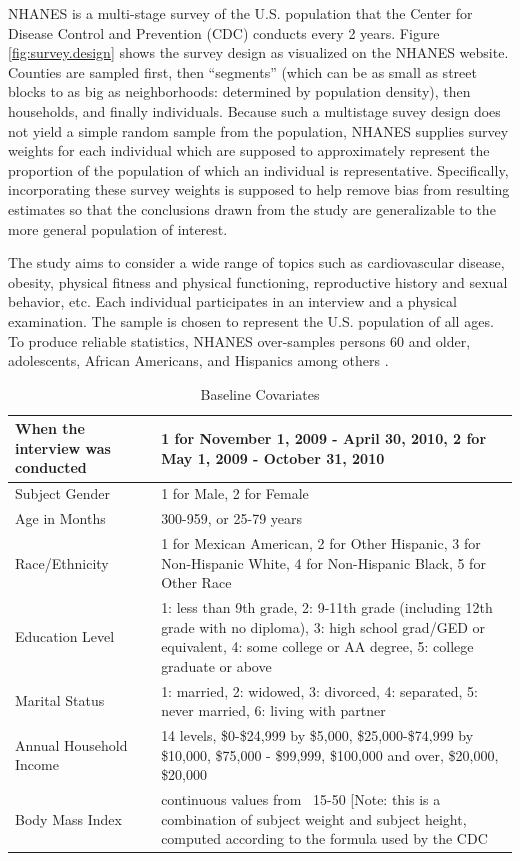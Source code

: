 \documentclass{article}
\begin{document}
NHANES is a multi-stage survey of the U.S. population that the Center for Disease Control and Prevention (CDC) conducts every 2 years.  Figure \ref{fig:survey.design}  shows the survey design as visualized on the NHANES website.  Counties are sampled first, then ``segments'' (which can be as small as street blocks to as big as neighborhoods: determined by population density), then households, and finally individuals.  Because such a multistage suvey design does not yield a simple random sample from the population, NHANES supplies survey weights for each individual which are supposed to approximately represent the proportion of the population of which an individual is representative. Specifically, incorporating these survey weights is supposed to help remove bias from resulting estimates so that the conclusions drawn from the study are generalizable to the more general population of interest.

The study aims to consider a wide range of topics such as cardiovascular disease, obesity, physical fitness and physical functioning, reproductive history and sexual behavior, etc.  Each individual participates in an interview and a physical examination.  The sample is chosen to represent the U.S. population of all ages.  To produce reliable statistics, NHANES over-samples persons 60 and older, adolescents, African Americans, and Hispanics among others \cite{survey}.  


\begin{table}
\centering
\begin{tabular}{| p{3cm} | p{8cm} |}
\hline
When the interview was conducted & 1 for November 1, 2009 - April 30, 2010, 2 for May 1, 2009 - October 31, 2010\\
\hline
Subject Gender & 1 for Male, 2 for Female\\
\hline
Age in Months & 300-959, or 25-79 years\\
\hline
Race/Ethnicity & 1 for Mexican American, 2 for Other Hispanic, 3 for Non-Hispanic White, 4 for Non-Hispanic Black, 5 for Other Race\\
\hline
Education Level & 1: less than 9th grade, 2: 9-11th grade (including 12th grade with no diploma), 3: high school grad/GED or equivalent, 4: some college or AA degree, 5: college graduate or above\\
\hline
Marital Status & 1: married, 2: widowed, 3: divorced, 4: separated, 5: never married, 6: living with partner\\
\hline
Annual Household Income & 14 levels, \$0-\$24,999 by \$5,000, \$25,000-\$74,999 by \$10,000,  \$75,000 - \$99,999, \$100,000 and over, \$20,000, \$20,000\\
\hline
Body Mass Index & continuous values from ~15-50 [Note: this is a combination of subject weight and subject height, computed according to the formula used by the CDC \cite{bmi}\\
\hline
\end{tabular}
\caption{Baseline Covariates}
\label{tab:Covariates}
\end{table}
\end{document}
